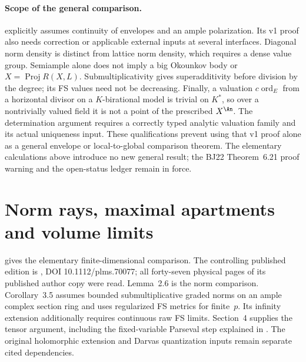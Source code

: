 \paragraph{Scope of the general comparison.}
\cite[Theorem~5.4.1]{Reb20AsymptoticFSV1} explicitly assumes
continuity of envelopes and an ample polarization. Its v1 proof
also needs correction or applicable external inputs at several
interfaces. Diagonal norm density is distinct from lattice norm
density, which requires a dense value group. Semiample alone
does not imply a big Okounkov body or \(X=\operatorname{Proj}R(X,L)\).
Submultiplicativity gives superadditivity before division by the
degree; its FS values need not be decreasing. Finally, a valuation
\(c\operatorname{ord}_E\) from a horizontal divisor on a
\(K\)-birational model is trivial on \(K^*\), so over a
nontrivially valued field it is not a point of the prescribed
\(X^{\An}\). The determination argument requires a correctly
typed analytic valuation family and its actual uniqueness input.
These qualifications prevent using that v1 proof alone as a
general envelope or local-to-global comparison theorem.
The elementary calculations above introduce no new general result;
the BJ22 Theorem~6.21 proof warning and the open-status ledger
remain in force.

\section{Norm rays, maximal apartments and volume limits}
\label{sec:appL-norm-ray-volume-interfaces}

 gives the elementary
finite-dimensional comparison. The controlling published
edition is \cite{Finski25SubmultiplicativePublished}, DOI
10.1112/plms.70077; all forty-seven physical pages of its
published author copy were read. Lemma~2.6 is the norm comparison.
Corollary~3.5 assumes bounded submultiplicative graded norms
on an ample complex section ring and uses regularized FS
metrics for finite~\(p\). Its infinity extension additionally
requires continuous raw FS limits. Section~4 supplies the
tensor argument, including the fixed-variable Parseval step
explained in . The original
holomorphic extension and Darvas quantization inputs remain
separate cited dependencies.

